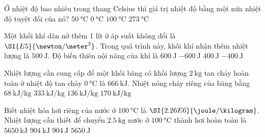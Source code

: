 \begin{ex}
	Ở nhiệt độ bao nhiêu trong thang Celsius thì giá trị nhiệt độ bằng một nửa nhiệt độ tuyệt đối của nó?
	\choice
	{$\SI{50}{\celsius}$}
	{$\SI{0}{\celsius}$}
	{$\SI{100}{\celsius}$}
	{\True $\SI{273}{\celsius}$}
\end{ex}
\begin{ex}
	Một khối khí dãn nở thêm 1 lít ở áp suất không đổi là $\SI{E5}{\newton/\meter^2}$. Trong quá trình này, khối khí nhận thêm nhiệt lượng là $\SI{500}{\joule}$. Độ biến thiên nội năng của khí là
	\choice
	{$\SI{600}{\joule}$}
	{$\SI{-600}{\joule}$}
{\True $\SI{400}{\joule}$}
	{$\SI{-400}{\joule}$}
\end{ex}
\begin{ex}
	Nhiệt lượng cần cung cấp để một khối băng có khối lượng $\SI{2}{\kilogram}$ tan chảy hoàn toàn ở nhiệt độ tan chảy $\SI{0}{\celsius}$ là $\SI{666}{\kilo\joule}$. Nhiệt nóng chảy riêng của băng bằng
	\choice
	{$\SI{68}{\kilo\joule/\kilogram}$}
	{\True $\SI{333}{\kilo\joule/\kilogram}$}
	{$\SI{136}{\kilo\joule/\kilogram}$}
	{$\SI{170}{\kilo\joule/\kilogram}$}
\end{ex}
\begin{ex}
	Biết nhiệt hóa hơi riêng của nước ở $\SI{100}{\celsius}$ là $\SI{2.26E6}{\joule/\kilogram}$. Nhiệt lượng cần thiết để chuyển $\SI{2.5}{\kilogram}$ nước ở $\SI{100}{\celsius}$ thành hơi hoàn toàn là
	\choice
	{\True $\SI{5650}{\kilo\joule}$}
	{$\SI{904}{\kilo\joule}$}
	{$\SI{904}{\joule}$}
	{$\SI{5650}{\joule}$}
\end{ex}
